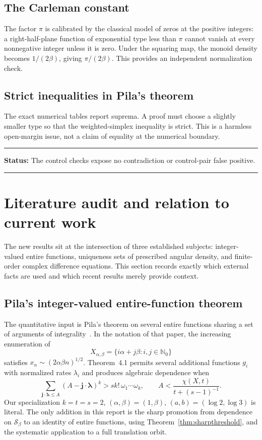 \documentclass[11pt,oneside]{article}
\theoremstyle{definition}
\theoremstyle{remark}
\newcommand{\Nzero}{\mathbb N_0}
\newcommand{\Sbeta}{\mathcal S_\beta}
\newenvironment{statusbox}[1]
{\begin{center}\begin{minipage}{0.94\textwidth}\raggedright\hrule\vspace{0.45em}\textbf{Status:} #1\par\vspace{0.35em}}
{\vspace{0.35em}\hrule\end{minipage}\end{center}}
\begin{document}
\subsection{The Carleman constant}

The factor $\pi$ is calibrated by the classical model of zeros at the positive integers:
a right-half-plane function of exponential type less than $\pi$ cannot vanish at every
nonnegative integer unless it is zero.  Under the squaring map, the monoid density becomes
$1/(2\beta)$, giving $\pi/(2\beta)$.  This provides an independent normalization check.

\subsection{Strict inequalities in Pila's theorem}

The exact numerical tables report suprema.  A proof must choose a slightly smaller type so
that the weighted-simplex inequality is strict.  This is a harmless open-margin issue, not a
claim of equality at the numerical boundary.

\begin{statusbox}{The control checks expose no contradiction or control-pair false positive.}
\end{statusbox}

\section{Literature audit and relation to current work}
\label{sec:literature}

The new results sit at the intersection of three established subjects: integer-valued entire
functions, uniqueness sets of prescribed angular density, and finite-order complex difference
equations.  This section records exactly which external facts are used and which recent
results merely provide context.

\subsection{Pila's integer-valued entire-function theorem}

The quantitative input is Pila's theorem on several entire functions sharing a set of
arguments of integrality~\cite{Pila2008}.  In the notation of that paper, the increasing
enumeration of
\[
 X_{\alpha,\beta}=\{i\alpha+j\beta:i,j\in\Nzero\}
\]
satisfies $x_n\sim(2\alpha\beta n)^{1/2}$.  Theorem~4.1 permits several additional
functions $g_i$ with normalized rates $\lambda_i$ and produces algebraic dependence when
\[
 \sum_{\mathbf j\cdot\boldsymbol\lambda\le A}
 (A-\mathbf j\cdot\boldsymbol\lambda)^k
 >s k!\,\omega_1\cdots\omega_k,
 \qquad
 A<\frac{\chi(X,t)}{t+(s-1)^{-1}}.
\]
Our specialization $k=t=s=2$, $(\alpha,\beta)=(1,\beta)$,
$(a,b)=(\log2,\log3)$ is literal.  The only addition in this report is the sharp promotion
from dependence on $\Sbeta$ to an identity of entire functions, using
Theorem~\ref{thm:sharpthreshold}, and the systematic application to a full translation
orbit.
\end{document}
